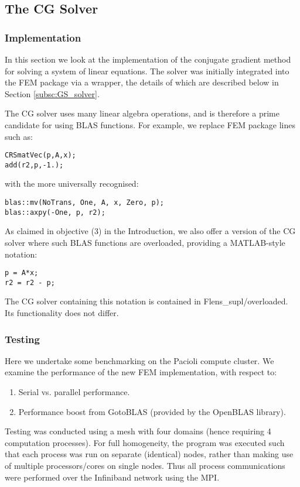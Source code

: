 \subsection{The CG Solver}

\subsubsection{Implementation}

In this section we look at the implementation of the conjugate gradient method for solving a system of linear equations. The solver was initially integrated into the FEM package via a wrapper, the details of which are described below in Section \ref{subsc:GS_solver}.

The CG solver uses many linear algebra operations, and is therefore a prime candidate for using BLAS functions. For example, we replace FEM package lines such as:
\begin{lstlisting}
CRSmatVec(p,A,x);
add(r2,p,-1.);
\end{lstlisting}
with the more universally recognised:
\begin{lstlisting}
blas::mv(NoTrans, One, A, x, Zero, p);
blas::axpy(-One, p, r2);
\end{lstlisting}

As claimed in objective (3) in the Introduction, we also offer a version of the CG solver where such BLAS functions are overloaded, providing a MATLAB-style notation:
\begin{lstlisting}
p = A*x;
r2 = r2 - p;
\end{lstlisting}

The CG solver containing this notation is contained in Flens\_supl/overloaded. Its functionality does not differ.

\subsubsection{Testing}


Here we undertake some benchmarking on the Pacioli compute cluster. We examine the performance of the new FEM implementation, with respect to:
\begin{enumerate}
   \item Serial vs. parallel performance.
   \item Performance boost from GotoBLAS (provided by the OpenBLAS library).
\end{enumerate}

Testing was conducted using a mesh with four domains (hence requiring 4 computation processes). For full homogeneity, the program was executed such that each process was run on separate (identical) nodes, rather than making use of multiple processors/cores on single nodes. Thus all process communications were performed over the Infiniband network using the MPI. 

